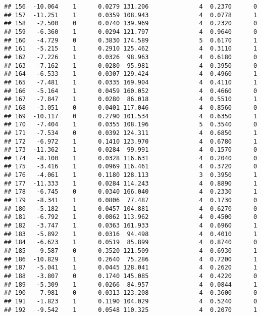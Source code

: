 \documentclass[
]{article}
\begin{document}
\begin{verbatim}
## 156  -10.064    1      0.0279 131.206              4  0.2370      0
## 157  -11.251    1      0.0359 108.943              4  0.0778      1
## 158   -2.500    0      0.0740 139.969              4  0.2320      0
## 159   -6.360    1      0.0294 121.797              4  0.9640      0
## 160   -4.729    0      0.3830 174.589              5  0.6170      1
## 161   -5.215    1      0.2910 125.462              4  0.3110      1
## 162   -7.226    1      0.0326  98.963              4  0.6180      0
## 163   -7.162    1      0.0280  95.981              4  0.3950      0
## 164   -6.533    1      0.0307 129.424              4  0.4960      1
## 165   -7.481    1      0.0335 169.904              4  0.4110      1
## 166   -5.164    1      0.0459 160.052              4  0.4660      0
## 167   -7.847    1      0.0280  86.018              4  0.5510      1
## 168   -3.051    0      0.0401 117.046              4  0.8560      0
## 169  -10.117    0      0.2790 101.534              4  0.6350      1
## 170   -7.404    1      0.0355 108.196              5  0.3540      0
## 171   -7.534    0      0.0392 124.311              4  0.6850      1
## 172   -6.972    1      0.1410 123.970              4  0.6780      1
## 173  -11.362    1      0.0284  99.991              4  0.1570      0
## 174   -8.100    1      0.0328 116.631              4  0.2040      0
## 175   -3.416    1      0.0969 116.461              4  0.3720      0
## 176   -4.061    1      0.1180 128.113              3  0.3950      1
## 177  -11.333    1      0.0284 114.243              4  0.8890      1
## 178   -6.745    0      0.0340 166.040              4  0.2330      1
## 179   -8.341    1      0.0806  77.487              4  0.1730      0
## 180   -5.182    1      0.0457 104.881              4  0.6270      0
## 181   -6.792    1      0.0862 113.962              4  0.4500      0
## 182   -3.747    1      0.0363 161.933              4  0.6960      1
## 183   -5.892    1      0.0316  94.498              4  0.4010      1
## 184   -6.623    1      0.0519  85.899              4  0.8740      0
## 185   -9.587    0      0.3520 121.509              4  0.6930      1
## 186  -10.829    1      0.2640  75.286              4  0.7200      1
## 187   -5.041    1      0.0445 128.041              4  0.2620      1
## 188   -3.807    0      0.1740 145.085              4  0.4220      0
## 189   -5.309    1      0.0266  84.957              4  0.0844      1
## 190   -7.981    0      0.0313 123.208              4  0.3600      0
## 191   -1.823    1      0.1190 104.029              4  0.5240      0
## 192   -9.542    1      0.0548 110.325              4  0.2070      1

\end{verbatim}
\end{document}
